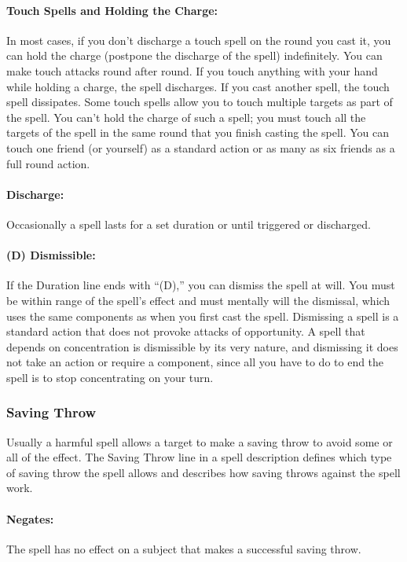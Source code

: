 \paragraph{Touch Spells and Holding the Charge:} In most cases, if you don't discharge a touch spell on the round you cast it, you can hold the charge (postpone the discharge of the spell) indefinitely. You can make touch attacks round after round. If you touch anything with your hand while holding a charge, the spell discharges. If you cast another spell, the touch spell dissipates.
Some touch spells allow you to touch multiple targets as part of the spell. You can't hold the charge of such a spell; you must touch all the targets of the spell in the same round that you finish casting the spell. You can touch one friend (or yourself) as a standard action or as many as six friends as a full round action.

\paragraph{Discharge:} Occasionally a spell lasts for a set duration or until triggered or discharged.

\paragraph{(D) Dismissible:} If the Duration line ends with “(D),” you can dismiss the spell at will. You must be within range of the spell's effect and must mentally will the dismissal, which uses the same components as when you first cast the spell. Dismissing a spell is a standard action that does not provoke attacks of opportunity. A spell that depends on concentration is dismissible by its very nature, and dismissing it does not take an action or require a component, since all you have to do to end the spell is to stop concentrating on your turn.

\subsubsection{Saving Throw}
\label{sec:SavingThrow}
Usually a harmful spell allows a target to make a saving throw to avoid some or all of the effect. 
The Saving Throw line in a spell description defines which type of saving throw the spell allows and describes how saving throws against the spell work.

\paragraph{Negates:} The spell has no effect on a subject that makes a successful saving throw.

